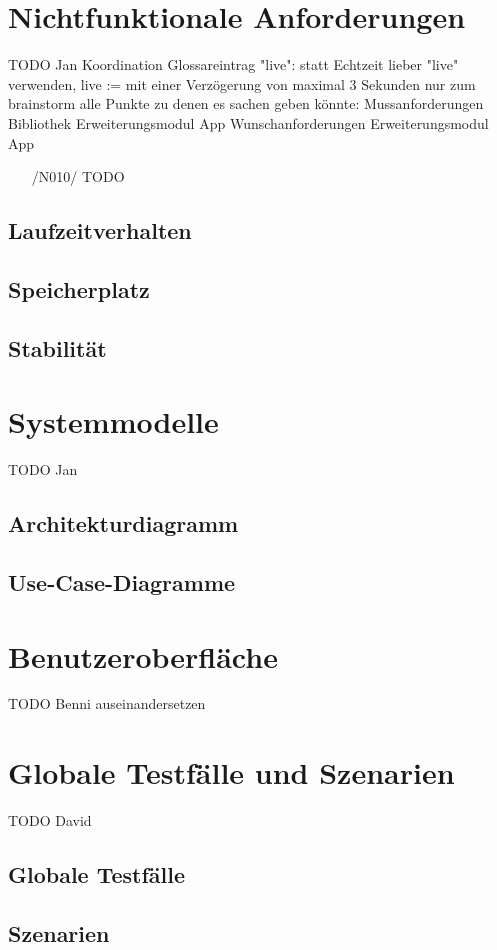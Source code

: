 \documentclass[a4paper,12pt]{article}
\begin{document}
\section{Nichtfunktionale Anforderungen}
TODO Jan Koordination
Glossareintrag "live": statt Echtzeit lieber "live" verwenden, live := mit einer Verzögerung von maximal 3 Sekunden
  nur zum brainstorm alle Punkte zu denen es sachen geben könnte:
  {Mussanforderungen}
      {Bibliothek}
      {Erweiterungsmodul}
      {App}
    {Wunschanforderungen}
      {Erweiterungsmodul}
      {App}
\begin{itemize}
  \item[/N010/] \textsf{TODO}
\end{itemize}
\subsection{Laufzeitverhalten}
\subsection{Speicherplatz}
\subsection{Stabilität}

\section{Systemmodelle}
TODO Jan
  \subsection{Architekturdiagramm}
  \subsection{Use-Case-Diagramme}
\section{Benutzeroberfläche}
TODO Benni auseinandersetzen
\section{Globale Testfälle und Szenarien}
TODO David
  \subsection{Globale Testfälle}
  \subsection{Szenarien}
\end{document}
